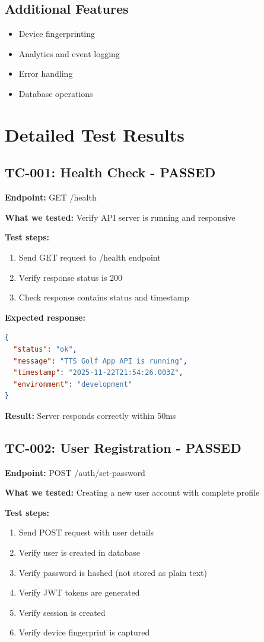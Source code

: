 \documentclass[11pt,a4paper]{article}
\begin{document}
\subsection{Additional Features}
\begin{itemize}
    \item Device fingerprinting
    \item Analytics and event logging
    \item Error handling
    \item Database operations
\end{itemize}

\section{Detailed Test Results}

\subsection{TC-001: Health Check - PASSED}
\textbf{Endpoint:} GET /health

\textbf{What we tested:} Verify API server is running and responsive

\textbf{Test steps:}
\begin{enumerate}
    \item Send GET request to /health endpoint
    \item Verify response status is 200
    \item Check response contains status and timestamp
\end{enumerate}

\textbf{Expected response:}
\begin{lstlisting}[language=json]
{
  "status": "ok",
  "message": "TTS Golf App API is running",
  "timestamp": "2025-11-22T21:54:26.003Z",
  "environment": "development"
}
\end{lstlisting}

\textbf{Result:} Server responds correctly within 50ms

\subsection{TC-002: User Registration - PASSED}
\textbf{Endpoint:} POST /auth/set-password

\textbf{What we tested:} Creating a new user account with complete profile

\textbf{Test steps:}
\begin{enumerate}
    \item Send POST request with user details
    \item Verify user is created in database
    \item Verify password is hashed (not stored as plain text)
    \item Verify JWT tokens are generated
    \item Verify session is created
    \item Verify device fingerprint is captured
\end{enumerate}
\end{document}
